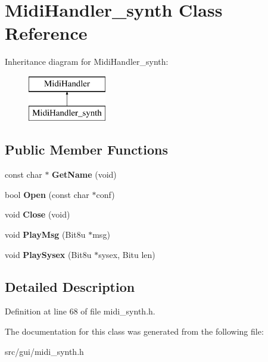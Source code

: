 \hypertarget{classMidiHandler__synth}{\section{Midi\-Handler\-\_\-synth Class Reference}
\label{classMidiHandler__synth}
}
Inheritance diagram for Midi\-Handler\-\_\-synth\-:\begin{figure}[H]
\begin{center}
\leavevmode
\includegraphics[height=2.000000cm]{classMidiHandler__synth}
\end{center}
\end{figure}
\subsection*{Public Member Functions}
\begin{DoxyCompactItemize}
\item 
\hypertarget{classMidiHandler__synth_a454a33652eaf4a99349caf378de56de0}{const char $\ast$ {\bfseries Get\-Name} (void)}\label{classMidiHandler__synth_a454a33652eaf4a99349caf378de56de0}

\item 
\hypertarget{classMidiHandler__synth_a026ce32cbfcb35586e6e6319a375f9ae}{bool {\bfseries Open} (const char $\ast$conf)}\label{classMidiHandler__synth_a026ce32cbfcb35586e6e6319a375f9ae}

\item 
\hypertarget{classMidiHandler__synth_ab73be86b44941f696b08a8eb2a4528e8}{void {\bfseries Close} (void)}\label{classMidiHandler__synth_ab73be86b44941f696b08a8eb2a4528e8}

\item 
\hypertarget{classMidiHandler__synth_afd4de648ae2becfbda22248e30856634}{void {\bfseries Play\-Msg} (Bit8u $\ast$msg)}\label{classMidiHandler__synth_afd4de648ae2becfbda22248e30856634}

\item 
\hypertarget{classMidiHandler__synth_a9f912eb5d21109f9b42c8a4b70d0544f}{void {\bfseries Play\-Sysex} (Bit8u $\ast$sysex, Bitu len)}\label{classMidiHandler__synth_a9f912eb5d21109f9b42c8a4b70d0544f}

\end{DoxyCompactItemize}


\subsection{Detailed Description}


Definition at line 68 of file midi\-\_\-synth.\-h.



The documentation for this class was generated from the following file\-:\begin{DoxyCompactItemize}
\item 
src/gui/midi\-\_\-synth.\-h\end{DoxyCompactItemize}
